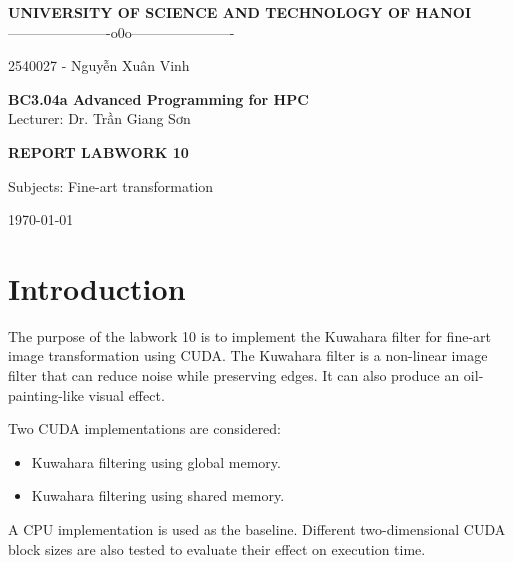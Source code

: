 \documentclass[11pt]{article}
\begin{document}
\begin{center}

{\Large \textbf{UNIVERSITY OF SCIENCE AND TECHNOLOGY OF HANOI}}\\
\vspace{0.3cm}
----------------------o0o----------------------\\

\vspace{4cm}

{\large
\centerline{2540027 - Nguyễn Xuân Vinh}
}

\vspace{4cm}

{\Huge \textbf{BC3.04a Advanced Programming for HPC}}\\
\vspace{0.5cm}
Lecturer: Dr. Trần Giang Sơn

\vspace{4cm}

{\Large \textbf{REPORT LABWORK 10}}\\

\vspace{0.5cm}

{\large
Subjects: Fine-art transformation
}

\vspace{4cm}
\today
\end{center}

\newpage

\newpage

\tableofcontents

\newpage

\section{Introduction}

The purpose of the labwork 10 is to implement the Kuwahara filter for
fine-art image transformation using CUDA. The Kuwahara filter is a
non-linear image filter that can reduce noise while preserving edges.
It can also produce an oil-painting-like visual effect.

Two CUDA implementations are considered:

\begin{itemize}
    \item Kuwahara filtering using global memory.
    \item Kuwahara filtering using shared memory.
\end{itemize}

A CPU implementation is used as the baseline. Different two-dimensional
CUDA block sizes are also tested to evaluate their effect on execution
time.
\end{document}
